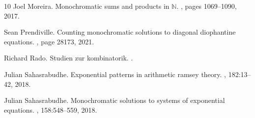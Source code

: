 \documentclass[10pt,a4paper]{article}
\theoremstyle{definition}
\begin{document}
\begin{thebibliography}{10}
Joel Moreira.
\newblock Monochromatic sums and products in $\mathbb{N}$.
, pages 1069--1090, 2017.

Sean Prendiville.
\newblock Counting monochromatic solutions to diagonal diophantine equations.
, page 28173, 2021.

Richard Rado.
\newblock Studien zur kombinatorik.
.

Julian Sahasrabudhe.
\newblock Exponential patterns in arithmetic ramsey theory.
, 182:13--42, 2018.

Julian Sahasrabudhe.
\newblock Monochromatic solutions to systems of exponential equations.
, 158:548--559, 2018.

\end{thebibliography}
\end{document}
